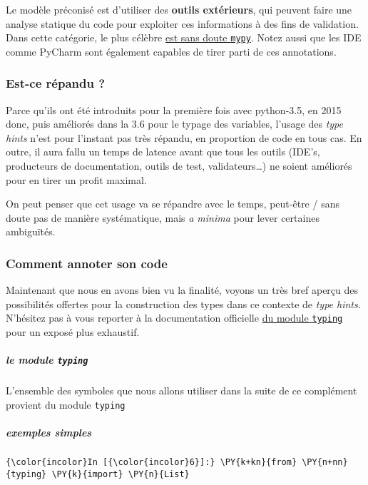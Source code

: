     Le modèle préconisé est d'utiliser des \textbf{outils extérieurs}, qui
peuvent faire une analyse statique du code pour exploiter ces
informations à des fins de validation. Dans cette catégorie, le plus
célèbre \href{http://mypy-lang.org/}{est sans doute \texttt{mypy}}.
Notez aussi que les IDE comme PyCharm sont également capables de tirer
parti de ces annotations.

    \hypertarget{est-ce-ruxe9pandu}{%
\subsubsection{Est-ce répandu ?}\label{est-ce-ruxe9pandu}}

    Parce qu'ils ont été introduits pour la première fois avec python-3.5,
en 2015 donc, puis améliorés dans la 3.6 pour le typage des variables,
l'usage des \emph{type hints} n'est pour l'instant pas très répandu, en
proportion de code en tous cas. En outre, il aura fallu un temps de
latence avant que tous les outils (IDE's, producteurs de documentation,
outils de test, validateurs\ldots{}) ne soient améliorés pour en tirer
un profit maximal.

On peut penser que cet usage va se répandre avec le temps, peut-être /
sans doute pas de manière systématique, mais \emph{a minima} pour lever
certaines ambiguïtés.

    \hypertarget{comment-annoter-son-code}{%
\subsubsection{Comment annoter son
code}\label{comment-annoter-son-code}}

    Maintenant que nous en avons bien vu la finalité, voyons un très bref
aperçu des possibilités offertes pour la construction des types dans ce
contexte de \emph{type hints}. N'hésitez pas à vous reporter à la
documentation officielle
\href{https://docs.python.org/3/library/typing.html}{du module
\texttt{typing}} pour un exposé plus exhaustif.

    \hypertarget{le-module-typing}{%
\subparagraph{\texorpdfstring{le module
\texttt{typing}}{le module typing}}\label{le-module-typing}}

    L'ensemble des symboles que nous allons utiliser dans la suite de ce
complément provient du module \texttt{typing}

    \hypertarget{exemples-simples}{%
\subparagraph{exemples simples}\label{exemples-simples}}

    \begin{Verbatim}[commandchars=\\\{\}]
{\color{incolor}In [{\color{incolor}6}]:} \PY{k+kn}{from} \PY{n+nn}{typing} \PY{k}{import} \PY{n}{List}
\end{Verbatim}


